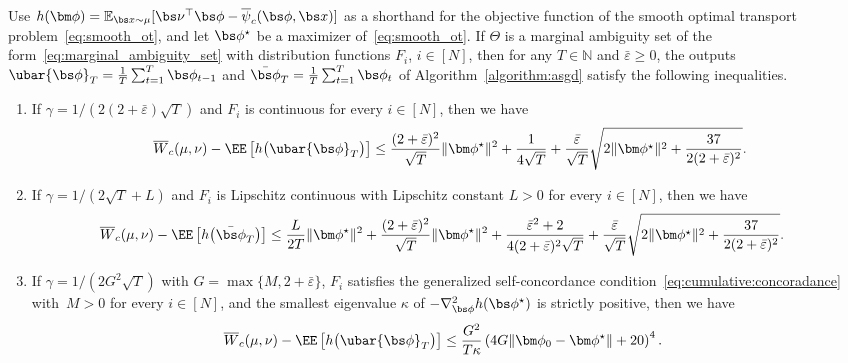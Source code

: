 \documentclass[11pt, a4paper, oneside, reqno]{article}
\begin{document}
	\begin{corollary}
	\label{corollary:convergence}
	    Use $h(\bm \phi) = \mathbb{E}_{\bs x \sim \mu} [ \bs \nu^\top \bs \phi - \overline\psi_c(\bs \phi, \bs x)]$ as a shorthand for the objective function of the smooth optimal transport problem~\eqref{eq:smooth_ot}, and let $\bs \phi^\star$ be a maximizer of~\eqref{eq:smooth_ot}.
	    If $\Theta$ is a marginal ambiguity set of the form~\eqref{eq:marginal_ambiguity_set} with distribution functions $F_i$, $i\in[N]$, then for any $T \in \mathbb N$ and $\bar \varepsilon\ge 0$, the outputs $\ubar{\bs \phi}_T = \frac{1}{T} \sum_{t=1}^{T} \bs \phi_{t-1}$ and $\bar{\bs \phi}_T = \frac{1}{T} \sum_{t=1}^{T} \bs \phi_{t}$ of Algorithm~\ref{algorithm:asgd} satisfy the following inequalities.
		\begin{enumerate} [label=(\roman*)]
			\item \label{corollary:convergence:Lipschitz} If $\gamma = 1 / (2 (2 + \bar \varepsilon) \sqrt{T})$ and $F_i$ is continuous for every $i\in[N]$, then we have
			\begin{align*}
			\overline W_c (\mu, \nu) - \EE \left[ h \big(\ubar{\bs \phi}_T \big) \right]
			\leq \frac{(2 + \bar \varepsilon)^2}{\sqrt{T}} \| \bm \phi^\star \|^2 + \frac{1}{4\sqrt{T}} + \frac{\bar \varepsilon}{\sqrt{T}} \sqrt{2 \| \bm \phi^\star \|^2 + \frac{37}{2(2 + \bar \varepsilon)^2}}.
			\end{align*}
			\item \label{corollary:convergence:smooth} If $\gamma = 1 / (2 \sqrt{T} + L)$ and $F_i$ is Lipschitz continuous with Lipschitz constant $L>0$ for every $i\in[N]$, then we have
			\begin{align*}
			\overline W_c (\mu, \nu) - \EE \left[ h \big(\bar{\bs \phi}_T \big) \right]
			&\leq \frac{L}{2T}\| \bm \phi^\star \|^2 + 
			\frac{(2 + \bar \varepsilon)^2}{\sqrt{T}} \| \bm \phi^\star \|^2 + \frac{\bar\varepsilon^2 + 2}{4 (2+\bar \varepsilon)^2\sqrt{T}} + \frac{\bar \varepsilon}{\sqrt{T}} \sqrt{2 \| \bm \phi^\star \|^2 + \frac{37}{2(2 + \bar \varepsilon)^2}}.
			\end{align*}
			\item \label{corollary:convergence:concordance} If $\gamma = 1 / (2 G^2 \sqrt{T}) $ with $G = \max \{M, 2 + \bar\varepsilon\}$, $F_i$ satisfies the generalized self-concordance condition~\eqref{eq:cumulative:concoradance} with~$M> 0$ for every $i\in[N]$, and the smallest eigenvalue $\kappa$ of $-\nabla^2_{\bs \phi} h(\bs \phi^\star)$ %
			is strictly positive, then we have
			\begin{align*}
			\overline W_c (\mu, \nu) - \EE \left[ h \big(\ubar{\bs \phi}_T \big) \right]
			&\leq \frac{G^2}{T \kappa} \left( 4 G \| \bm \phi_0 - \bm \phi^\star \| + 20 \right)^4.
			\end{align*}
		\end{enumerate}
	\end{corollary}
\end{document}
